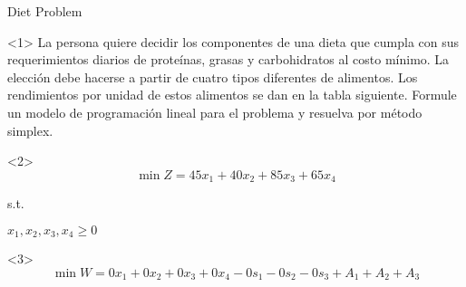 \begin{frameExample}{Diet Problem}{}
  \begin{onlyenv}<1>
      La persona quiere decidir los componentes de una dieta que cumpla con sus requerimientos diarios de proteínas, grasas y carbohidratos al costo mínimo. La elección debe hacerse a partir de cuatro tipos diferentes de alimentos. Los rendimientos por unidad de estos alimentos se dan en la tabla siguiente. Formule un modelo de programación lineal para el problema y resuelva por método simplex.


  {\centering
    \par}    
\end{onlyenv}

  \begin{onlyenv}<2>
    \[ \min Z = 45x_1 + 40x_2 + 85x_3 + 65x_4   \]

    {\centering
      s.t.  %
      

    $x_1, x_2, x_3, x_4 \geq 0$
  \par}
  \end{onlyenv}
  
  \begin{onlyenv}<3>
    \[ \min W = 0x_1 + 0x_2 + 0x_3 + 0x_4 - 0s_1 - 0s_2 - 0s_3  + A_1 + A_2 + A_3 \]


\end{onlyenv}
\end{frameExample}
